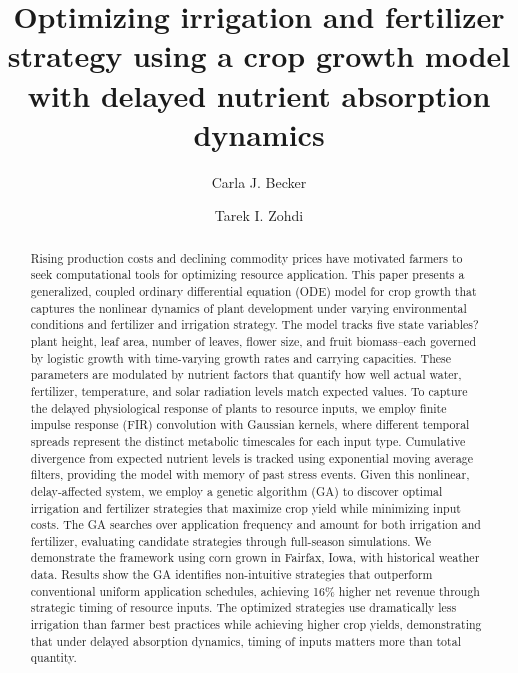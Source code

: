 \documentclass[preprint,12pt]{elsarticle}
\begin{document}
\linenumbers
\begin{frontmatter}
\title{Optimizing irrigation and fertilizer strategy using a crop growth model with delayed nutrient absorption dynamics}

\author{Carla J. Becker}

\author{Tarek I. Zohdi}
            	
\begin{abstract}
Rising production costs and declining commodity prices have motivated farmers to seek computational tools for optimizing resource application. This paper presents a generalized, coupled ordinary differential equation (ODE) model for crop growth that captures the nonlinear dynamics of plant development under varying environmental conditions and fertilizer and irrigation strategy. The model tracks five state variables?plant height, leaf area, number of leaves, flower size, and fruit biomass--each governed by logistic growth with time-varying growth rates and carrying capacities. These parameters are modulated by nutrient factors that quantify how well actual water, fertilizer, temperature, and solar radiation levels match expected values. To capture the delayed physiological response of plants to resource inputs, we employ finite impulse response (FIR) convolution with Gaussian kernels, where different temporal spreads represent the distinct metabolic timescales for each input type. Cumulative divergence from expected nutrient levels is tracked using exponential moving average filters, providing the model with memory of past stress events. Given this nonlinear, delay-affected system, we employ a genetic algorithm (GA) to discover optimal irrigation and fertilizer strategies that maximize crop yield while minimizing input costs. The GA searches over application frequency and amount for both irrigation and fertilizer, evaluating candidate strategies through full-season simulations. We demonstrate the framework using corn grown in Fairfax, Iowa, with historical weather data. Results show the GA identifies non-intuitive strategies that outperform conventional uniform
application schedules, achieving 16\% higher net revenue through strategic timing of resource inputs. The optimized strategies use dramatically less irrigation than farmer best practices while achieving higher crop yields, demonstrating that under delayed absorption dynamics, timing of inputs matters more than total quantity.
\end{abstract}


\end{frontmatter}
\end{document}
